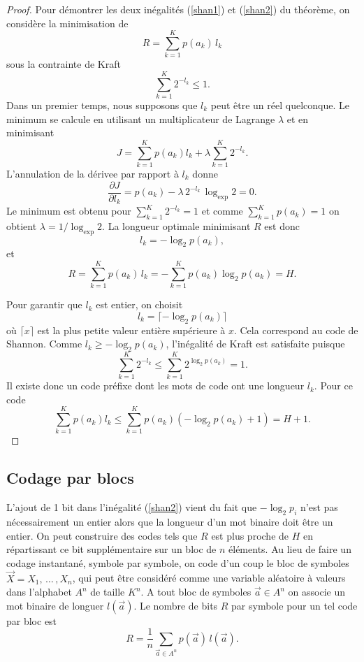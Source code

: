 \begin{proof}
Pour d\'emontrer les deux in\'egalit\'es (\ref{shan1}) et
(\ref{shan2}) du
th\'eor\`eme, on consid\`ere la minimisation de
\[
R = \sum_{k=1}^K p(a_k) \,l_k
\]
sous la contrainte de Kraft
\[
\sum_{k=1}^K 2^{-l_k} \leq 1 .
\]
Dans un premier temps, nous
supposons que $l_k$ peut \^etre un r\'eel quelconque.
Le minimum se calcule en utilisant un multiplicateur de
Lagrange $\lambda$ et en minimisant
\[
J = \sum_{k=1}^K p(a_k) l_k + \lambda \sum_{k=1}^K 2^{-l_k} .
\]
L'annulation de la d\'erivee par rapport \`a $l_k$ donne
\[
\frac {\partial J} {\partial l_k} = p(a_k) - \lambda \,2^{-l_k}\,
\log_{\exp} 2  = 0 .
\]
Le minimum est obtenu pour $\sum_{k=1}^K 2^{-l_k} = 1$
et comme $\sum_{k=1}^K p(a_k) = 1$ on obtient
$\lambda = 1/\log_{\exp} 2$. La longueur optimale minimisant
$R$ est donc
\[
l_k = -\log_2 p(a_k) ,
\]
et
\[
R =
\sum_{k=1}^K p(a_k)\, l_k = - \sum_{k=1}^K p(a_k) \log_2 p(a_k) = H .
\]

Pour garantir que $l_k$ est entier, on choisit
\[
l_k = \lceil - \log_2 p(a_k) \rceil
\]
o\`u $\lceil x \rceil$ est la plus petite valeur enti\`ere
sup\'erieure \`a $x$.
Cela correspond au code de Shannon.
Comme $l_k \geq - \log_2 p(a_k)$, l'in\'egalit\'e
de Kraft est satisfaite puisque
\[
\sum_{k=1}^K 2^{-l_k} \leq \sum_{k=1}^K 2^{\log_2 p(a_k)} = 1 .
\]
Il existe donc un code pr\'efixe dont les mots de code
ont une longueur $l_k$. Pour ce code
\[
\sum_{k=1}^K p(a_k) l_k \leq
\sum_{k=1}^K p(a_k) (-\log_2 p(a_k) + 1) = H + 1 .
\]
\end{proof}

\subsection{Codage par blocs}
L'ajout de 1 bit dans l'in\'egalit\'e (\ref{shan2})
vient du fait que $-\log_2 p_i$ n'est pas n\'ecessairement
un entier alors que la longueur d'un mot binaire doit
\^etre un entier. On peut construire des codes tels que
$R$ est plus proche de $H$ en r\'epartissant ce bit
suppl\'ementaire sur un bloc de $n$ \'el\'ements.
Au lieu de faire un codage instantan\'e, symbole par symbole,
on code d'un coup le bloc de symboles
$\vec X = X_1 , \,\dots\,,X_n$, qui peut \^etre consid\'er\'e
comme une variable al\'eatoire \`a valeurs dans
l'alphabet $A^n$ de taille $K^n$.
A tout bloc de symboles $\vec a \in A^n$ on associe un
mot binaire de longuer $l(\vec a)$. Le nombre de bits
$R$ par symbole pour un tel code par bloc est
\[
R = \frac 1 n \sum_{\vec a \in A^n} p(\vec a) \, l(\vec a) .
\]


